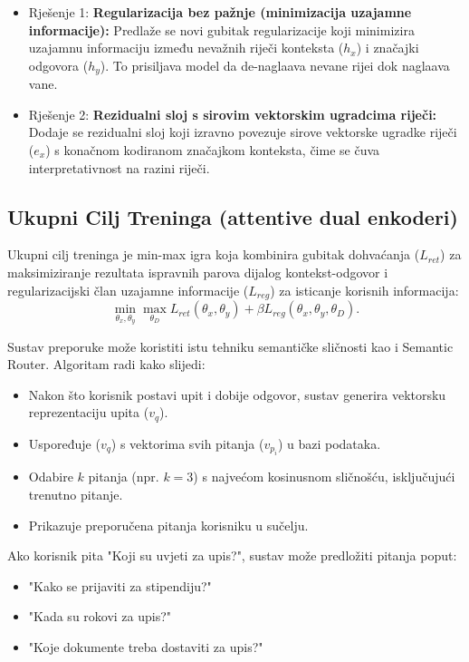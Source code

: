 \begin{itemize}
\item Rješenje 1: \textbf{Regularizacija bez pažnje (minimizacija uzajamne informacije):} Predlaže se novi gubitak regularizacije koji minimizira uzajamnu informaciju između nevažnih riječi konteksta ($h_x$) i značajki odgovora ($h_y$). To prisiljava model da de-naglaava nevane rijei dok naglaava vane.

\item Rješenje 2: \textbf{Rezidualni sloj s sirovim vektorskim ugradcima riječi:} Dodaje se rezidualni sloj koji izravno povezuje sirove vektorske ugradke riječi ($e_x$) s konačnom kodiranom značajkom konteksta, čime se čuva interpretativnost na razini riječi.
\end{itemize}


\subsection{Ukupni Cilj Treninga (attentive dual enkoderi)} Ukupni cilj treninga je min-max igra koja kombinira gubitak dohvaćanja ($L_{ret}$) za maksimiziranje rezultata ispravnih parova dijalog kontekst-odgovor i regularizacijski član uzajamne informacije ($L_{reg}$) za isticanje korisnih informacija: $$\min_{\theta_x,\theta_y} \max_{\theta_D} L_{ret}(\theta_x, \theta_y) + \beta L_{reg}(\theta_x, \theta_y, \theta_D).$$


Sustav preporuke može koristiti istu tehniku semantičke sličnosti kao i Semantic Router. 
Algoritam radi kako slijedi:
\begin{itemize}
    \item Nakon što korisnik postavi upit i dobije odgovor, sustav generira vektorsku reprezentaciju upita ($v_q$).
    \item Uspoređuje ($v_q$) s vektorima svih pitanja ($v_{p_i}$) u bazi podataka.
    \item Odabire $k$ pitanja (npr. $k = 3$) s najvećom kosinusnom sličnošću, isključujući trenutno pitanje.
    \item Prikazuje preporučena pitanja korisniku u sučelju.
\end{itemize}

Ako korisnik pita "Koji su uvjeti za upis?", sustav može predložiti pitanja poput:
\begin{itemize}
\item   "Kako se prijaviti za stipendiju?"
\item   "Kada su rokovi za upis?"
\item   "Koje dokumente treba dostaviti za upis?"
\end{itemize}



